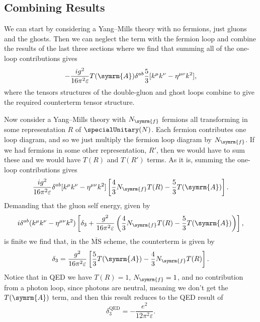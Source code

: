 \documentclass[fleqn]{NotesClass}
\newcommand{\MSbar}{\ensuremath{\overline{\text{MS}}}}
\newcommand{\minkowskiMetric}{\eta}
\newcommand{\adjointRep}{\symrm{A}}
\newcommand{\numberFermions}{N_{\symrm{f}}}
\begin{document}
    \subsection{Combining Results}
    We can start by considering a Yang--Mills theory with no fermions, just gluons and the ghosts.
    Then we can neglect the term with the fermion loop and combine the results of the last three sections where we find that summing all of the one-loop contributions gives
    \begin{equation}
        -\frac{ig^2}{16\pi^2\varepsilon} T(\adjointRep)\delta^{ab}\frac{5}{3}[k^\mu k^\nu - \minkowskiMetric^{\mu\nu}k^2],
    \end{equation}
    where the tensors structures of the double-gluon and ghost loops combine to give the required counterterm tensor structure.
    
    Now consider a Yang--Mills theory with \(\numberFermions\) fermions all transforming in some representation \(R\) of \(\specialUnitary(N)\).
    Each fermion contributes one loop diagram, and so we just multiply the fermion loop diagram by \(\numberFermions\).
    If we had fermions in some other representation, \(R'\), then we would have to sum these and we would have \(T(R)\) and \(T(R')\) terms.
    As it is, summing the one-loop contributions gives
    \begin{equation}
        \frac{ig^2}{16\pi^2\varepsilon} \delta^{ab}[k^\mu k^\nu - \minkowskiMetric^{\mu\nu}k^2]\left[ \frac{4}{3}\numberFermions T(R) - \frac{5}{3}T(\adjointRep) \right].
    \end{equation}
    Demanding that the gluon self energy, given by
    \begin{equation}
        i\delta^{ab}(k^\mu k^\nu - \minkowskiMetric^{\mu\nu}k^2) \left[ \delta_3 + \frac{g^2}{16\pi^2\varepsilon} \left( \frac{4}{3}\numberFermions T(R) - \frac{5}{3}T(\adjointRep) \right) \right],
    \end{equation}
    is finite we find that, in the \MSbar{} scheme, the counterterm is given by
    \begin{equation}
        \delta_3 = \frac{g^2}{16\pi^2\varepsilon}\left[ \frac{5}{3}T(\adjointRep) - \frac{4}{3}\numberFermions T(R) \right].
    \end{equation}
    Notice that in QED we have \(T(R) = 1\), \(\numberFermions = 1\), and no contribution from a photon loop, since photons are neutral, meaning we don't get the \(T(\adjointRep)\) term, and then this result reduces to the QED result of
    \begin{equation}
        \delta_3^{\text{QED}} = -\frac{e^2}{12\pi^2\varepsilon}.
    \end{equation}
    
\end{document}
